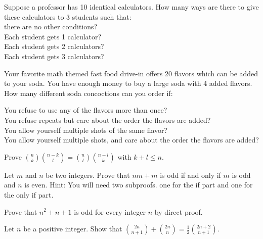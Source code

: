 \begin{exercise}
Suppose a professor has 10 identical calculators.  How many ways are there to give these calculators to 3 students such that:\\
there are no other conditions?\\
Each student gets 1 calculator?\\
Each student gets 2 calculators?\\
Each student gets 3 calculators?\\
\end{exercise}




\begin{exercise}
Your favorite math themed fast food drive-in offers 20 flavors which can be added to your soda. You have enough money to buy a large soda with 4 added flavors. How many different soda concoctions can you order if:

You refuse to use any of the flavors more than once?\\
You refuse repeats but care about the order the flavors are added?\\
You allow yourself multiple shots of the same flavor?\\
You allow yourself multiple shots, and care about the order the flavors are added?\\
\end{exercise}

\begin{proofp}
Prove $\binom{n}{k}\binom{n-k}{l}=\binom{n}{l}\binom{n-l}{k}$ with $k+l \leq n$.
\end{proofp}

\begin{proofp}
Let $m$ and $n$ be two integers.  Prove that $mn+m$ is odd if and only if $m$ is odd and $n$ is even. Hint:  You will need two subproofs.  one for the if part and one for the only if part.
\end{proofp}

\begin{proofp}
Prove that $n^2+n+1$ is odd for every integer $n$ by direct proof. 
\end{proofp}

\begin{proofp}
Let $n$ be a positive integer.  Show that $\binom{2n}{n+1}+\binom{2n}{n}=\frac{1}{2}\binom{2n+2}{n+1}$.
\end{proofp}

